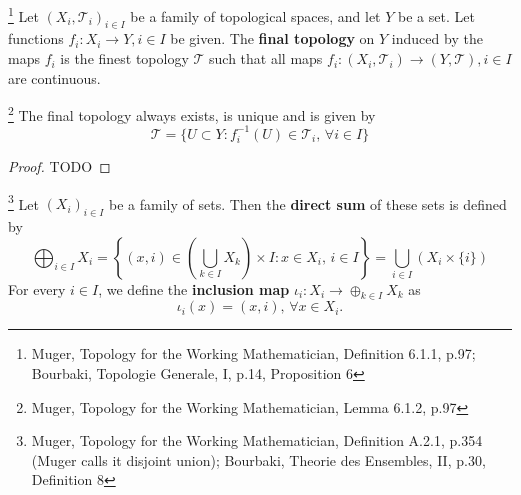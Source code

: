 \begin{definition}
  \footnote{Muger, Topology for the Working Mathematician, Definition 6.1.1, 
    p.97; Bourbaki, Topologie Generale, I, p.14, Proposition 6 }
  Let $(X_i,\mathcal{T}_i)_{i\in I}$ be a family of topological spaces, and let $Y$
  be a set. Let functions $f_i:X_i\to Y, i\in I$ be given. The
  \textbf{final topology}  
  on $Y$ induced by the maps $f_i$ is the finest topology $\mathcal{T}$
  such that all maps $f_i:(X_i,\mathcal{T}_i)\to (Y,\mathcal{T}), i\in I$
  are continuous.
\end{definition}

\begin{lemma} \label{L:fin_topo}
  \footnote{Muger, Topology for the Working Mathematician, Lemma 6.1.2, p.97}
  The final topology always exists, is unique and is given by
  \[
    \mathcal{T} = \{ U\subset Y: f_i^{-1}(U)\in\mathcal{T}_i, \, \forall i\in I \}
  \]
\end{lemma}
\begin{proof}
TODO
\end{proof}



\begin{definition}
  \footnote{Muger, Topology for the Working Mathematician, Definition A.2.1, 
    p.354 (Muger calls it disjoint union); 
    Bourbaki, Theorie des Ensembles, II, p.30, Definition 8 }
  Let $(X_i)_{i\in I}$ be a family of sets. Then the
  \textbf{direct sum} 
  of these sets is defined by
  \[
    \bigoplus_{i\in I} X_i = \left\{
      (x,i)\in (\bigcup_{k\in I} X_k) \times I: x\in X_i, \, i\in I
    \right\}
    = \bigcup_{i\in I} (X_i \times \{i\})
  \]
  For every $i\in I$, we define the
  \textbf{inclusion map} 
  $\iota_i: X_i\to\oplus_{k\in I} X_k$ as
  \[
    \iota_i(x)=(x,i), \, \forall x\in X_i.
  \]
\end{definition}

